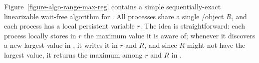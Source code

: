 Figure~\ref{figure-algo-range-max-reg} contains a simple sequentially-exact linearizable wait-free algorithm for \RangeMaxReg. All processes share a single \R/\W object \(R\), and each process has a local persistent variable \(r\). The idea is straightforward: each process locally stores in \(r\) the maximum value it is aware of; whenever it discovers a new largest value in \RMaxW, it writes it in \(r\) and \(R\), and since \(R\) might not have the largest value, it returns the maximum among \(r\) and \(R\) in \RMaxR.


\begin{figure}[H]
\end{figure}

